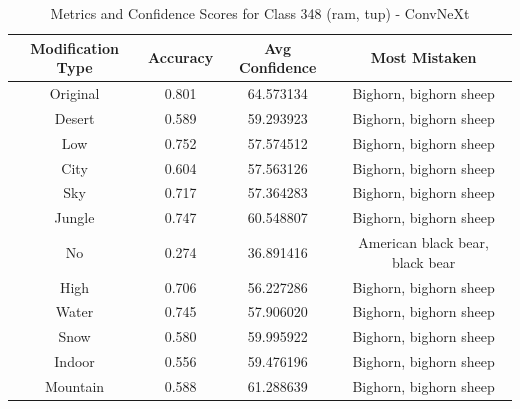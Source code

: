 \begin{table}
	\centering
	\begin{tabular}{|c|c|c|c|}
		\hline
		\textbf{Modification Type} & \textbf{Accuracy} & \textbf{Avg Confidence} & \textbf{Most Mistaken} \\
		\hline
		Original & 0.801 & 64.573134 & Bighorn, bighorn sheep \\
		\hline
		Desert & 0.589 & 59.293923 & Bighorn, bighorn sheep \\
		\hline
		Low & 0.752 & 57.574512 & Bighorn, bighorn sheep \\
		\hline
		City & 0.604 & 57.563126 & Bighorn, bighorn sheep \\
		\hline
		Sky & 0.717 & 57.364283 & Bighorn, bighorn sheep \\
		\hline
		Jungle & 0.747 & 60.548807 & Bighorn, bighorn sheep \\
		\hline
		No & 0.274 & 36.891416 & American black bear, black bear \\
		\hline
		High & 0.706 & 56.227286 & Bighorn, bighorn sheep \\
		\hline
		Water & 0.745 & 57.906020 & Bighorn, bighorn sheep \\
		\hline
		Snow & 0.580 & 59.995922 & Bighorn, bighorn sheep \\
		\hline
		Indoor & 0.556 & 59.476196 & Bighorn, bighorn sheep \\
		\hline
		Mountain & 0.588 & 61.288639 & Bighorn, bighorn sheep \\
		\hline
	\end{tabular}
	\caption{Metrics and Confidence Scores for Class 348 (ram, tup) - ConvNeXt}
	\label{tab:metrics_confidence_class_348_convnext}
\end{table}

